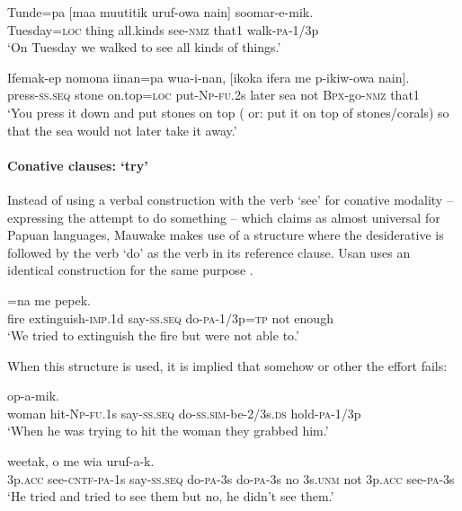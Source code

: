 \ea%
\label{ex:8:x1633}
\gll Tunde=pa  [maa  muutitik  uruf-owa  nain]  soomar-e-mik.\\
Tuesday=\textsc{loc} thing all.kinds see-\textsc{nmz} that1  walk-\textsc{pa}-1/3p\\
\glt`On Tuesday we walked to see all kinds of things.'
\z


\ea%
\label{ex:8:x1634}
\gll Ifemak-ep  nomona  iinan=pa  wua-i-nan,  [ikoka  ifera  me p-ikiw-owa  nain]. \\
press-\textsc{ss}.\textsc{seq} stone on.top=\textsc{loc} put-\textsc{Np}-\textsc{fu}.2s later sea not \textsc{Bpx}-go-\textsc{nmz} that1\\
\glt`You press it down and put stones on top ( or: put it on top of stones/corals) so that the sea would not later take it away.'
\z


\paragraph[Conative clauses: `try' ]{Conative clauses: `try'}  \label{sec:8.3.2.1.5}

Instead of using a verbal construction with the verb `see' for conative modality -- expressing the attempt to do something -- which \citet[152]{Foley1986} claims as almost universal for Papuan languages, Mauwake makes use of a structure where the desiderative is followed by the verb  `do' as the verb in its reference clause. Usan uses an identical construction for the same purpose \citep[258]{Reesink1987}. 

\ea%
\label{ex:8:x373}
=na  me  pepek.\\
fire  extinguish-\textsc{imp}.1d say-\textsc{ss}.\textsc{seq} do-\textsc{pa}-1/3p=\textsc{tp} not enough\\
\glt`We tried to extinguish the fire but were not able to.'
\z


When this structure is used, it is implied that somehow or other the effort fails:

\ea%
\label{ex:8:x374}
  op-a-mik.\\
woman hit-\textsc{Np}-\textsc{fu}.1s say-\textsc{ss}.\textsc{seq} do-\textsc{ss}.\textsc{sim}-be-2/3s.\textsc{ds} hold-\textsc{pa}-1/3p\\
\glt`When he was trying to hit the woman they grabbed him.'
\z


\ea%
\label{ex:8:x1606}
 weetak, o me wia  uruf-a-k.\\
3p.\textsc{acc} see-\textsc{cntf}-\textsc{pa}-1s say-\textsc{ss}.\textsc{seq} do-\textsc{pa}-3s do-\textsc{pa}-3s no 3s.\textsc{unm} not  3p.\textsc{acc} see-\textsc{pa}-3s\\
\glt`He tried and tried to see them but no, he didn't see them.'
\z


